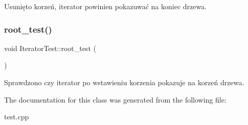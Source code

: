 Usunięto korzeń, iterator powinien pokazuwać na koniec drzewa. \mbox{\label{class_iterator_test_a9a97bde928f26d4482c1f422dff08b1e}} 
\subsubsection{\texorpdfstring{root\+\_\+test()}{root\_test()}}
{\footnotesize\ttfamily void Iterator\+Test\+::root\+\_\+test (\begin{DoxyParamCaption}{ }\end{DoxyParamCaption})\hspace{0.3cm}{\ttfamily [inline]}}

Sprawdzono czy iterator po wstawieniu korzenia pokazuje na korzeń drzewa. 

The documentation for this class was generated from the following file\+:\begin{DoxyCompactItemize}
\item 
test.\+cpp\end{DoxyCompactItemize}
